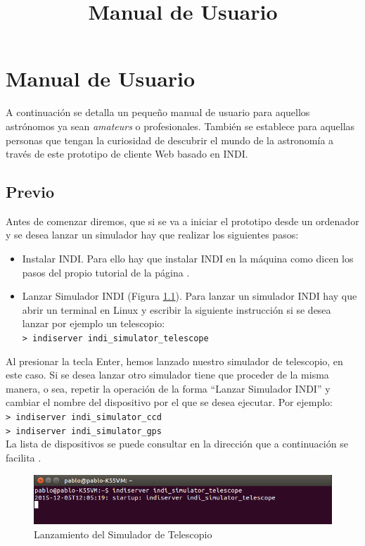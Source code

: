 \chapter{Manual de Usuario}
\title{Manual de Usuario}
\label{cap:ManualDeUsuario}

A continuación se detalla un pequeño manual de usuario para aquellos astrónomos ya sean  \textit{amateurs} o profesionales. También se establece para aquellas personas que tengan la curiosidad de descubrir el mundo de la astronomía a través de este prototipo de cliente Web basado en INDI.

\section{Previo}
Antes de comenzar diremos, que si se va a iniciar el prototipo desde un ordenador y se desea lanzar un simulador hay que realizar los siguientes pasos:
\begin{itemize}
  \item Instalar INDI. Para ello hay que instalar INDI en la máquina como dicen los pasos del propio tutorial de la página \cite{InstalarINDI}.
  \item Lanzar Simulador INDI (Figura \ref{fig:INDIServer}). Para lanzar un simulador INDI hay que abrir un terminal en Linux \cite{Linux} y escribir la siguiente instrucción si se desea lanzar por ejemplo un telescopio:\\
  \texttt{> indiserver indi\_simulator\_telescope}
\end{itemize}

Al presionar la tecla Enter, hemos lanzado nuestro simulador de telescopio, en este caso. Si se desea lanzar otro simulador tiene que proceder de la misma manera, o sea, repetir la operación de la forma “Lanzar Simulador INDI” y cambiar el nombre del dispositivo por el que se desea ejecutar. Por ejemplo:\\
\texttt{> indiserver indi\_simulator\_ccd}\\
\texttt{> indiserver indi\_simulator\_gps}\\

La lista de dispositivos se puede consultar en la dirección que a continuación se facilita \cite{ListaDispositivos}.

\begin{figure}[htb]
\centering
\includegraphics[width=1\textwidth]{./imagenes/capturaINDIServer}
\caption{Lanzamiento del Simulador de Telescopio} \label{fig:INDIServer}
\end{figure}

